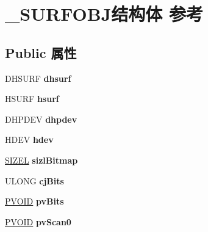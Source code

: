 \hypertarget{struct___s_u_r_f_o_b_j}{}\section{\+\_\+\+S\+U\+R\+F\+O\+B\+J结构体 参考}
\label{struct___s_u_r_f_o_b_j}
\subsection*{Public 属性}
\begin{DoxyCompactItemize}
\item 
\mbox{\label{struct___s_u_r_f_o_b_j_a94a1b80f8aeb56a4bcca6c92450eb3b2}} 
D\+H\+S\+U\+RF {\bfseries dhsurf}
\item 
\mbox{\label{struct___s_u_r_f_o_b_j_ac34421d1f25c1d2433a95bf9173b65ad}} 
H\+S\+U\+RF {\bfseries hsurf}
\item 
\mbox{\label{struct___s_u_r_f_o_b_j_a1afb952be933e545cbbd9d0c8323c4e0}} 
D\+H\+P\+D\+EV {\bfseries dhpdev}
\item 
\mbox{\label{struct___s_u_r_f_o_b_j_aa348f53110749707b8d233ee749a2134}} 
H\+D\+EV {\bfseries hdev}
\item 
\mbox{\label{struct___s_u_r_f_o_b_j_a3359cf5d8233268b6f36767a56005424}} 
\hyperlink{structtag_s_i_z_e}{S\+I\+Z\+EL} {\bfseries sizl\+Bitmap}
\item 
\mbox{\label{struct___s_u_r_f_o_b_j_af870447f82621c7cb31f6442b51eb9a0}} 
U\+L\+O\+NG {\bfseries cj\+Bits}
\item 
\mbox{\label{struct___s_u_r_f_o_b_j_a4b614127ea4edf74a33cc6188370d448}} 
\hyperlink{interfacevoid}{P\+V\+O\+ID} {\bfseries pv\+Bits}
\item 
\mbox{\label{struct___s_u_r_f_o_b_j_a76b8c67e7ec17d17b684085e81d5e3f5}} 
\hyperlink{interfacevoid}{P\+V\+O\+ID} {\bfseries pv\+Scan0}
\item 
\mbox{\label{struct___s_u_r_f_o_b_j_aefb56fa3c308bed8e61c4407a72661e7}} 

\end{DoxyCompactItemize}
